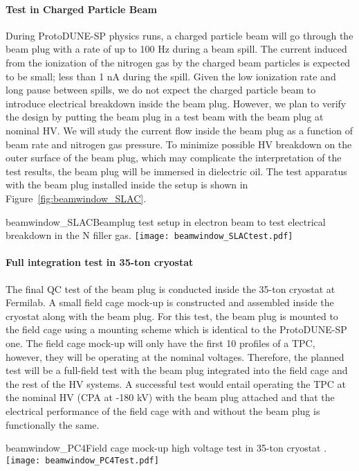 \paragraph{Test in Charged Particle Beam}
During ProtoDUNE-SP physics runs, a charged particle beam will go through the beam plug with a rate of up to 100 Hz during a beam spill. The current induced from the ionization of the nitrogen gas by the charged beam particles is expected to be small; less than 1 nA during the spill. Given the low ionization rate and long pause between spills, we do not expect the charged particle beam to introduce electrical breakdown inside the beam plug. However, we plan to verify the design by putting the beam plug in a test beam with the beam plug at nominal HV. We will study the current flow inside the beam plug as a function of beam rate and nitrogen gas pressure. To minimize possible HV breakdown on the outer surface of the beam plug, which may complicate the interpretation of the test results, the beam plug will be immersed in dielectric oil. The test apparatus with the beam plug installed inside the setup is shown in Figure~\ref{fig:beamwindow_SLAC}.
\begin{cdrfigure}{beamwindow_SLAC}{Beamplug test setup in electron beam to test electrical breakdown in the N filler gas.}
  \texttt{[image: beamwindow\_SLACtest.pdf]}
\end{cdrfigure}

\paragraph{Full integration test in 35-ton cryostat}
The final QC test of the beam plug is conducted inside the 35-ton cryostat at Fermilab. A small field cage mock-up is constructed and assembled inside the cryostat along with the beam plug. For this test, the beam plug is mounted to the field cage using a mounting scheme which is identical to the ProtoDUNE-SP one. The field cage mock-up will only have the first 10 profiles of a TPC, however, they will be operating at the nominal voltages. Therefore, the planned test will be a full-field test with the beam plug integrated into the field cage and the rest of the HV systems. A successful test would entail operating the TPC at the nominal HV (CPA at -180 kV) with the beam plug attached and that the electrical performance of the field cage with and without the beam plug is functionally the same.

\begin{cdrfigure}{beamwindow_PC4}{Field cage mock-up high voltage test in 35-ton cryostat .}
  \texttt{[image: beamwindow\_PC4Test.pdf]}
\end{cdrfigure}


